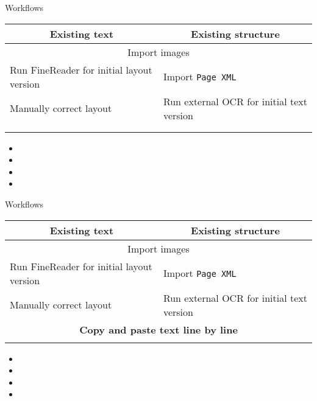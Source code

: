 \documentclass{bbawslides}
\begin{document}
\begin{bbawslide}{Workflows}
  \vspace*{2mm}%
  \centerslidestrue%
  \begin{center}
    \begin{tabular}{|l|l|}
      \hline
      \multicolumn{1}{|c|}{\textbf{Existing text}} & \multicolumn{1}{c|}{\textbf{Existing structure}} \\
      \hline
      \hline
      \multicolumn{2}{|c|}{Import images} \\
      \hline
      Run FineReader for initial layout version & Import \texttt{Page XML} \\
      \hline
      Manually correct layout & Run external OCR for initial text version \\
      \hline
      \multicolumn{2}{|c|}{\bf \phantom{Copy and paste text line by line}} \\
      \hline
      & \phantom{Manually correct text} \\
      \hline
    \end{tabular}
  \end{center}
  \begin{itemize}
    \item
    \item
    \item
    \item
  \end{itemize}
\end{bbawslide}

\begin{bbawslide}{Workflows}
  \vspace*{2mm}%
  \centerslidestrue%
  \begin{center}
    \begin{tabular}{|l|l|}
      \hline
      \multicolumn{1}{|c|}{\textbf{Existing text}} & \multicolumn{1}{c|}{\textbf{Existing structure}} \\
      \hline
      \hline
      \multicolumn{2}{|c|}{Import images} \\
      \hline
      Run FineReader for initial layout version & Import \texttt{Page XML} \\
      \hline
      Manually correct layout & Run external OCR for initial text version \\
      \hline
      \multicolumn{2}{|c|}{\bf Copy and paste text line by line} \\
      \hline
      & \phantom{Manually correct text} \\
      \hline
    \end{tabular}
  \end{center}
  \begin{itemize}
    \item
    \item
    \item
    \item
  \end{itemize}
\end{bbawslide}
\end{document}
